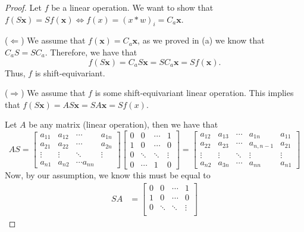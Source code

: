 \documentclass[twoside]{article}
\begin{document}
\begin{proof}
	Let $f$ be a linear operation. We want to show that $f(S\bm{x}) = Sf(\bm{x}) \iff f(x) = (x * w)_{i} = C_{a}\bm{x}$.

	($\Leftarrow$)
	We assume that $f(\bm{x}) = C_{a} \bm{x}$, as we proved in (a) we know that $C_{a}S = SC_{a}$.
	Therefore, we have that
	\begin{equation*}
		f(S \bm{x}) = C_{a}S \bm{x} = SC_{a}\bm{x} = Sf(\bm{x}).
	\end{equation*}
	Thus, $f$ is shift-equivariant.

	($\Rightarrow$)
	We assume that $f$ is some shift-equivariant linear operation.
	This implies that $f(S \bm{x}) = AS \bm{x} = SA \bm{x} = Sf(x)$.

	Let $A$ be any matrix (linear operation), then we have that
	\begin{equation*}
		AS =
		\begin{bmatrix}
			a_{11} & a_{12} & \cdots        & a_{1n} \\
			a_{21} & a_{22} & \cdots        & a_{2n} \\
			\vdots & \vdots & \ddots        & \vdots \\
			a_{n1} & a_{n2} & \cdots a_{nn}
		\end{bmatrix}
		\begin{bmatrix}
			0 & 0      & \cdots & 1      \\
			1 & 0      & \cdots & 0      \\
			0 & \ddots & \ddots & \vdots \\
			0 & \cdots & 1      & 0
		\end{bmatrix}
		=
		\begin{bmatrix}
			a_{12} & a_{13} & \cdots & a_{1n}       & a_{11} \\
			a_{22} & a_{23} & \cdots & a_{n, n - 1} & a_{21} \\
			\vdots & \vdots & \ddots & \vdots       & \vdots \\
			a_{n2} & a_{3n} & \cdots & a_{nn}       & a_{n1}
		\end{bmatrix}
	\end{equation*}
	Now, by our assumption, we know this must be equal to
	\begin{align*}
		SA
		 & =
		\begin{bmatrix}
			0 & 0      & \cdots & 1      \\
			1 & 0      & \cdots & 0      \\
			0 & \ddots & \ddots & \vdots \\

\end{bmatrix}
\end{align*}
\end{proof}
\end{document}
